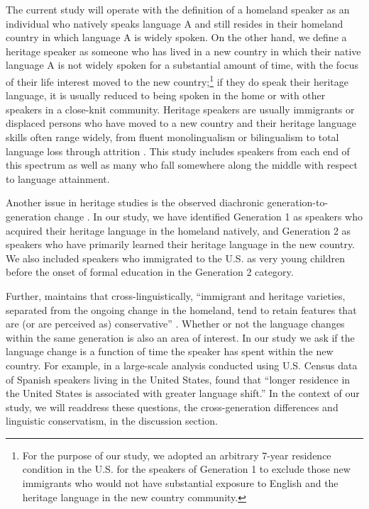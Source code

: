 \documentclass[output=paper,
modfonts,
newtxmath,
hidelinks,
]{langscibook}
\begin{document}
The current study will operate with the definition of a homeland speaker as an individual who natively speaks language A and still resides in their homeland country in which language A is widely spoken. On the other hand, we define a heritage speaker as someone who has lived in a new country in which their native language A is not widely spoken for a substantial amount of time, with the focus of their life interest moved to the new country;\footnote{For the purpose of our study, we adopted an arbitrary 7-year residence condition in the U.S. for the speakers of Generation 1 to exclude those new immigrants who would not have substantial exposure to English and the heritage language in the new country community.} if they do speak their heritage language, it is usually reduced to being spoken in the home or with other speakers in a close-knit community. Heritage speakers are usually immigrants or displaced persons who have moved to a new country and their heritage language skills often range widely, from fluent monolingualism or bilingualism to total language loss through attrition \citep{Scontras-etal2015}. This study includes speakers from each end of this spectrum as well as many who fall somewhere along the middle with respect to language attainment.



Another issue in heritage studies is the observed diachronic generation-to-generation change \citep{Otheguy-etal2007}. In our study, we have identified Generation 1 as speakers who acquired their heritage language in the homeland natively, and Generation 2 as speakers who have primarily learned their heritage language in the new country. We also included speakers who immigrated to the U.S. as very young children before the onset of formal education in the Generation 2 category.



Further, \citet{Polinsky2018} maintains that cross-linguistically, “immigrant and heritage varieties, separated from the ongoing change in the homeland, tend to retain features that are (or are perceived as) conservative” \citep[129]{Polinsky2018}. Whether or not the language changes within the same generation is also an area of interest. In our study we ask if the language change is a function of time the speaker has spent within the new country. For example, in a large-scale analysis conducted using U.S. Census data of Spanish speakers living in the United States, \citet{Veltman2000} found that “longer residence in the United States is associated with greater language shift.” \citep[66]{Veltman2000} In the context of our study, we will readdress these questions, the cross-generation differences and linguistic conservatism, in the discussion section.
\end{document}
